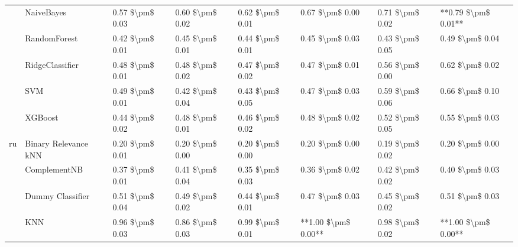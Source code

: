\begin{tabular}{llllllll}
   & NaiveBayes &      0.57 \$\textbackslash pm\$ 0.03 &           0.60 \$\textbackslash pm\$ 0.02 &       0.62 \$\textbackslash pm\$ 0.01 &        0.67 \$\textbackslash pm\$ 0.00 &                         0.71 \$\textbackslash pm\$ 0.02 &  **0.79 \$\textbackslash pm\$ 0.01** \\
   & RandomForest &      0.42 \$\textbackslash pm\$ 0.01 &           0.45 \$\textbackslash pm\$ 0.01 &       0.44 \$\textbackslash pm\$ 0.01 &        0.45 \$\textbackslash pm\$ 0.03 &                         0.43 \$\textbackslash pm\$ 0.05 &      0.49 \$\textbackslash pm\$ 0.04 \\
   & RidgeClassifier &      0.48 \$\textbackslash pm\$ 0.01 &           0.48 \$\textbackslash pm\$ 0.02 &       0.47 \$\textbackslash pm\$ 0.02 &        0.47 \$\textbackslash pm\$ 0.01 &                         0.56 \$\textbackslash pm\$ 0.00 &      0.62 \$\textbackslash pm\$ 0.02 \\
   & SVM &      0.49 \$\textbackslash pm\$ 0.01 &           0.42 \$\textbackslash pm\$ 0.04 &       0.43 \$\textbackslash pm\$ 0.05 &        0.47 \$\textbackslash pm\$ 0.03 &                         0.59 \$\textbackslash pm\$ 0.06 &      0.66 \$\textbackslash pm\$ 0.10 \\
   & XGBoost &      0.44 \$\textbackslash pm\$ 0.02 &           0.48 \$\textbackslash pm\$ 0.01 &       0.46 \$\textbackslash pm\$ 0.02 &        0.48 \$\textbackslash pm\$ 0.02 &                         0.52 \$\textbackslash pm\$ 0.05 &      0.55 \$\textbackslash pm\$ 0.03 \\
ru & Binary Relevance kNN &      0.20 \$\textbackslash pm\$ 0.01 &           0.20 \$\textbackslash pm\$ 0.00 &       0.20 \$\textbackslash pm\$ 0.00 &        0.20 \$\textbackslash pm\$ 0.00 &                         0.19 \$\textbackslash pm\$ 0.02 &      0.20 \$\textbackslash pm\$ 0.00 \\
   & ComplementNB &      0.37 \$\textbackslash pm\$ 0.01 &           0.41 \$\textbackslash pm\$ 0.04 &       0.35 \$\textbackslash pm\$ 0.03 &        0.36 \$\textbackslash pm\$ 0.02 &                         0.42 \$\textbackslash pm\$ 0.02 &      0.40 \$\textbackslash pm\$ 0.03 \\
   & Dummy Classifier &      0.51 \$\textbackslash pm\$ 0.04 &           0.49 \$\textbackslash pm\$ 0.02 &       0.44 \$\textbackslash pm\$ 0.01 &        0.47 \$\textbackslash pm\$ 0.03 &                         0.45 \$\textbackslash pm\$ 0.02 &      0.51 \$\textbackslash pm\$ 0.03 \\
   & KNN &      0.96 \$\textbackslash pm\$ 0.03 &           0.86 \$\textbackslash pm\$ 0.03 &       0.99 \$\textbackslash pm\$ 0.01 &    **1.00 \$\textbackslash pm\$ 0.00** &                         0.98 \$\textbackslash pm\$ 0.02 &  **1.00 \$\textbackslash pm\$ 0.00** \\

\end{tabular}
